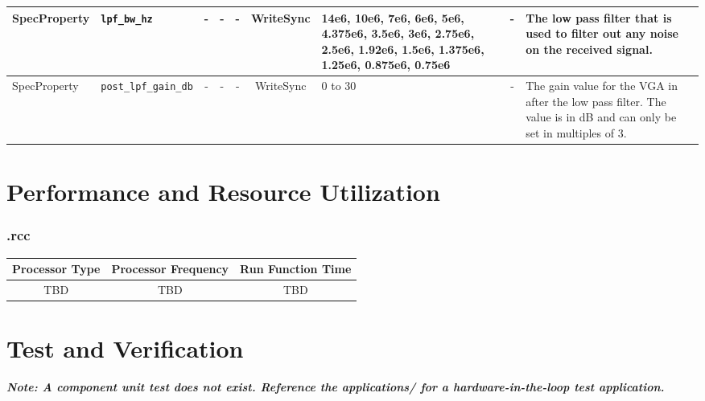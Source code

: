 \begin{landscape}
\begin{scriptsize}
\begin{tabular}{|p{2cm}|p{3cm}|c|c|c|c|p{2.5cm}|c|p{7cm}|}
			\hline
			SpecProperty & \verb+lpf_bw_hz+              & -    & -        & -          & WriteSync      & 14e6, 10e6, 7e6, 6e6, 5e6, 4.375e6, 3.5e6, 3e6, 2.75e6, 2.5e6, 1.92e6, 1.5e6, 1.375e6, 1.25e6, 0.875e6, 0.75e6 & -       & The low pass filter that is used to filter out any noise on the received signal.                                                                                                                                                                                    \\
			\hline
			SpecProperty & \verb+post_lpf_gain_db+       & -    & -        & -          & WriteSync      & 0 to 30                                                                                                        & -       & The gain value for the VGA in after the low pass filter. The value is in dB and can only be set in multiples of 3.                                                                                                                                                  \\
			\hline
		\end{tabular}
	\end{scriptsize}
\end{landscape}

\section*{Performance and Resource Utilization}
\subsubsection*{\comp.rcc}
\begin{scriptsize}
	\begin{tabular}{|c|c|c|}
		\hline
		\rowcolor{blue}
		Processor Type & Processor Frequency & Run Function Time \\
		\hline
		TBD            & TBD                 & TBD               \\
		\hline
	\end{tabular}
\end{scriptsize}

\section*{Test and Verification}

\textit{\textbf{Note: A component unit test does not exist.  Reference the applications/ for a hardware-in-the-loop test application.}}\\ \medskip

